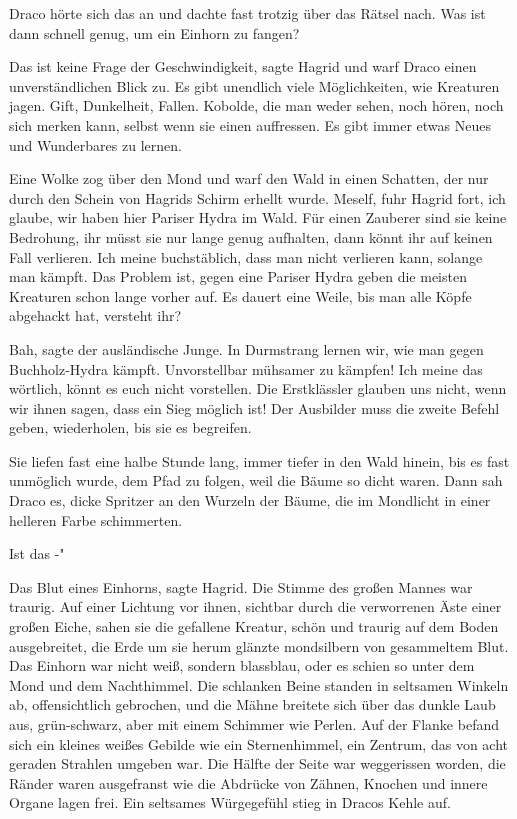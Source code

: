 Draco hörte sich das an und dachte fast trotzig über das Rätsel nach. \glqq Was
ist dann schnell genug, um ein Einhorn zu fangen?\grqq{}

\glqq Das ist keine Frage der Geschwindigkeit\grqq{}, sagte Hagrid und warf
Draco einen unverständlichen Blick zu. \glqq Es gibt unendlich viele
Möglichkeiten, wie Kreaturen jagen. Gift, Dunkelheit, Fallen. Kobolde,
die man weder sehen, noch hören, noch sich merken kann, selbst wenn sie
einen auffressen. Es gibt immer etwas Neues und Wunderbares zu
lernen.\grqq{}

Eine Wolke zog über den Mond und warf den Wald in einen Schatten, der nur durch
den Schein von Hagrids Schirm erhellt wurde. \glqq Meself\grqq{}, fuhr
Hagrid fort, \glqq ich glaube, wir haben hier Pariser Hydra im Wald. Für
einen Zauberer sind sie keine Bedrohung, ihr müsst sie nur lange genug
aufhalten, dann könnt ihr auf keinen Fall verlieren. Ich meine
buchstäblich, dass man nicht verlieren kann, solange man kämpft. Das
Problem ist, gegen eine Pariser Hydra geben die meisten Kreaturen schon
lange vorher auf. Es dauert eine Weile, bis man alle Köpfe abgehackt hat,
versteht ihr?\grqq{}

\glqq Bah\grqq{}, sagte der ausländische Junge. \glqq In Durmstrang lernen wir,
wie man gegen Buchholz-Hydra kämpft. Unvorstellbar mühsamer zu kämpfen!
Ich meine das wörtlich, könnt es euch nicht vorstellen. Die Erstklässler
glauben uns nicht, wenn wir ihnen sagen, dass ein Sieg möglich ist! Der
Ausbilder muss die zweite Befehl geben, wiederholen, bis sie es
begreifen.\grqq{}

Sie liefen fast eine halbe Stunde lang, immer tiefer in den Wald hinein, bis es
fast unmöglich wurde, dem Pfad zu folgen, weil die Bäume so dicht waren.
Dann sah Draco es, dicke Spritzer an den Wurzeln der Bäume, die im
Mondlicht in einer helleren Farbe schimmerten.

\glqq Ist das -"

\glqq Das Blut eines Einhorns\grqq{}, sagte Hagrid. Die Stimme des großen Mannes
war traurig. Auf einer Lichtung vor ihnen, sichtbar durch die verworrenen
Äste einer großen Eiche, sahen sie die gefallene Kreatur, schön und
traurig auf dem Boden ausgebreitet, die Erde um sie herum glänzte
mondsilbern von gesammeltem Blut. Das Einhorn war nicht weiß, sondern
blassblau, oder es schien so unter dem Mond und dem Nachthimmel. Die
schlanken Beine standen in seltsamen Winkeln ab, offensichtlich
gebrochen, und die Mähne breitete sich über das dunkle Laub aus,
grün-schwarz, aber mit einem Schimmer wie Perlen. Auf der Flanke befand
sich ein kleines weißes Gebilde wie ein Sternenhimmel, ein Zentrum, das
von acht geraden Strahlen umgeben war. Die Hälfte der Seite war
weggerissen worden, die Ränder waren ausgefranst wie die Abdrücke von
Zähnen, Knochen und innere Organe lagen frei. Ein seltsames Würgegefühl
stieg in Dracos Kehle auf.

